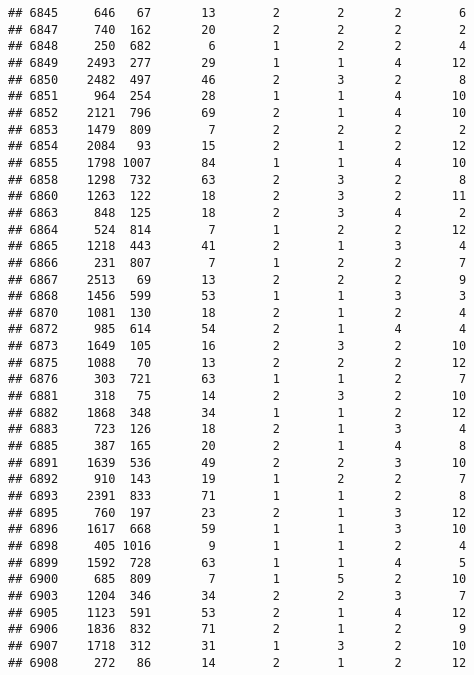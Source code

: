 \documentclass[]{article}
\begin{document}
\begin{verbatim}
## 6845     646   67       13        2        2       2        6
## 6847     740  162       20        2        2       2        2
## 6848     250  682        6        1        2       2        4
## 6849    2493  277       29        1        1       4       12
## 6850    2482  497       46        2        3       2        8
## 6851     964  254       28        1        1       4       10
## 6852    2121  796       69        2        1       4       10
## 6853    1479  809        7        2        2       2        2
## 6854    2084   93       15        2        1       2       12
## 6855    1798 1007       84        1        1       4       10
## 6858    1298  732       63        2        3       2        8
## 6860    1263  122       18        2        3       2       11
## 6863     848  125       18        2        3       4        2
## 6864     524  814        7        1        2       2       12
## 6865    1218  443       41        2        1       3        4
## 6866     231  807        7        1        2       2        7
## 6867    2513   69       13        2        2       2        9
## 6868    1456  599       53        1        1       3        3
## 6870    1081  130       18        2        1       2        4
## 6872     985  614       54        2        1       4        4
## 6873    1649  105       16        2        3       2       10
## 6875    1088   70       13        2        2       2       12
## 6876     303  721       63        1        1       2        7
## 6881     318   75       14        2        3       2       10
## 6882    1868  348       34        1        1       2       12
## 6883     723  126       18        2        1       3        4
## 6885     387  165       20        2        1       4        8
## 6891    1639  536       49        2        2       3       10
## 6892     910  143       19        1        2       2        7
## 6893    2391  833       71        1        1       2        8
## 6895     760  197       23        2        1       3       12
## 6896    1617  668       59        1        1       3       10
## 6898     405 1016        9        1        1       2        4
## 6899    1592  728       63        1        1       4        5
## 6900     685  809        7        1        5       2       10
## 6903    1204  346       34        2        2       3        7
## 6905    1123  591       53        2        1       4       12
## 6906    1836  832       71        2        1       2        9
## 6907    1718  312       31        1        3       2       10
## 6908     272   86       14        2        1       2       12

\end{verbatim}
\end{document}
